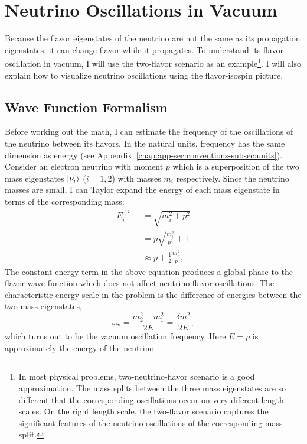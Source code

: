 

\chapter{\label{chap:basics}Neutrino Oscillations in Vacuum}

Because the flavor eigenstates of the neutrino are not the same as its propagation eigenstates, it can change flavor while it propagates. To understand its flavor oscillation in vacuum, I will use the two-flavor scenario as an example\footnote{In most physical problems, two-neutrino-flavor scenario is a good approximation. The mass splits between the three mass eigenstates are so different that the corresponding oscillations occur on very diferent length scales. On the right length scale, the two-flavor scenario captures the significant features of the neutrino oscillations of the corresponding mass split.}. I will also explain how to visualize neutrino oscillations using the flavor-isospin picture.

\section{Wave Function Formalism}

Before working out the math, I can estimate the frequency of the oscillations of the neutrino between its flavors. In the natural units, frequency has the same dimension as energy (see Appendix~\ref{chap:app-sec:conventions-subsec:units}). Consider an electron neutrino with moment $p$ which is a superposition of the two mass eigenstates $\left| \nu_i\right\rangle$ ($i=1,2$) with masses $m_i$ respectively. Since the neutrino masses are small, I can Taylor expand the energy of each mass eigenstate in terms of the corresponding mass:
\begin{align}
E_i^{(v)} & = \sqrt{m_i^2 + p^2 } \nonumber\\
& = p \sqrt{\frac{m_i^2}{p^2} + 1} \nonumber\\
& \approx p + \frac{1}{2} \frac{m_i^2}{p},
\label{chap:basics-section:neutrinos-eqn:energy-taylor}
\end{align}
The constant energy term in the above equation produces a global phase to the flavor wave function which does not affect neutrino flavor oscillations. The characteristic energy scale in the problem is the difference of energies between the two mass eigenstates,
\begin{equation}
    \omega_{\mathrm v} =  \frac{m_2^2-m_1^2}{2E} = \frac{\delta m^2}{2E},
    \label{chap:basics-section:neutrinos-eqn:qualitative-method-frequency}
\end{equation}
which turns out to be the vacuum oscillation frequency. Here $E=p$ is approximately the energy of the neutrino.

